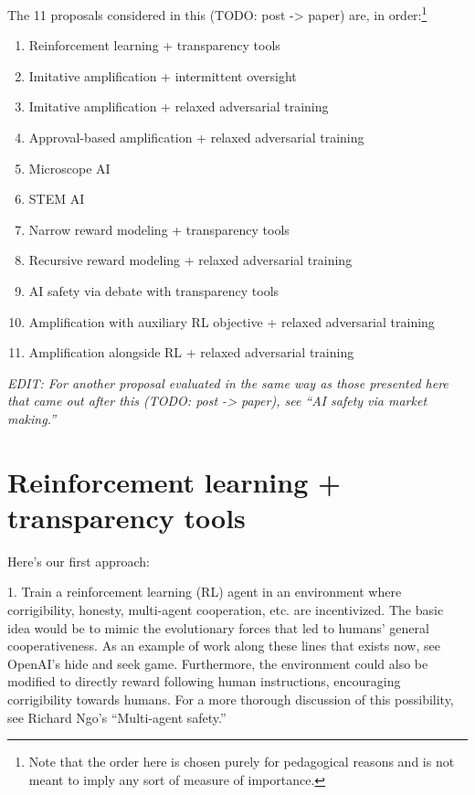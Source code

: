 The 11 proposals considered in this (TODO: post -> paper) are, in order:\footnote{Note that the order here is chosen purely for pedagogical reasons and is not meant to imply any sort of measure of importance.}

\begin{enumerate}
\item Reinforcement learning + transparency tools
\item Imitative amplification + intermittent oversight
\item Imitative amplification + relaxed adversarial training
\item Approval-based amplification + relaxed adversarial training
\item Microscope AI
\item STEM AI
\item Narrow reward modeling + transparency tools
\item Recursive reward modeling + relaxed adversarial training
\item AI safety via debate with transparency tools
\item Amplification with auxiliary RL objective + relaxed adversarial training
\item Amplification alongside RL + relaxed adversarial training
\end{enumerate}

\textit{EDIT: For another proposal evaluated in the same way as those presented here that came out after this (TODO: post -> paper), see ``AI safety via market making\cite{TODO: cite https://www.alignmentforum.org/posts/YWwzccGbcHMJMpT45/ai-safety-via-market-making}.''}

\section{Reinforcement learning + transparency tools}
\label{sec:1}

Here's our first approach:

1. Train a reinforcement learning (RL) agent in an environment where corrigibility, honesty, multi-agent cooperation, etc. are incentivized. The basic idea would be to mimic the evolutionary forces that led to humans' general cooperativeness. As an example of work along these lines that exists now, see OpenAI's hide and seek game\cite{TODO: cite https://openai.com/blog/emergent-tool-use}. Furthermore, the environment could also be modified to directly reward following human instructions, encouraging corrigibility towards humans. For a more thorough discussion of this possibility, see Richard Ngo's ``Multi-agent safety\cite{TODO: cite https://www.lesswrong.com/posts/BXMCgpktdiawT3K5v/multi-agent-safety}.''

